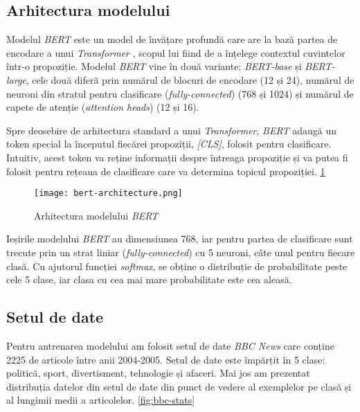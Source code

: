 \subsection{Arhitectura modelului}
Modelul \textit{BERT} este un model de învățare profundă care are la bază partea de encodare a unui \textit{Transformer} \cite{vaswani2023attention},
scopul lui fiind de a înțelege contextul cuvintelor într-o propoziție. Modelul \textit{BERT} vine în două
variante: \textit{BERT-base} și \textit{BERT-large}, cele două diferă prin numărul de blocuri de encodare (12 și 24),
numărul de neuroni din stratul pentru clasificare (\textit{fully-connected}) (768 și 1024) și numărul de
capete de atenție (\textit{attention heads}) (12 și 16).

\par
Spre deosebire de arhitectura standard a unui \textit{Transformer}, \textit{BERT} adaugă un token
special la începutul fiecărei propoziții, \textit{[CLS]}, folosit pentru clasificare. Intuitiv,
acest token va reține informații despre întreaga propoziție și va putea fi folosit pentru rețeaua
de clasificare care va determina topicul propoziției. \ref{fig:bert-architecture}

\begin{figure}[h]
    \centering
    \texttt{[image: bert-architecture.png]}
    \caption{Arhitectura modelului \textit{BERT} \protect\footnotemark[2]}
    \label{fig:bert-architecture}
\end{figure}
\vspace{1em}

\par
Ieșirile modelului \textit{BERT} au dimensiunea 768, iar pentru partea de clasificare sunt trecute
prin un strat liniar (\textit{fully-connected}) cu 5 neuroni, câte unul pentru fiecare clasă.
Cu ajutorul funcției \textit{softmax}, se obține o distribuție de probabilitate peste cele
5 clase, iar clasa cu cea mai mare probabilitate este cea aleasă.


\vspace{1em}

\subsection{Setul de date}
\vspace{1em}
Pentru antrenarea modelului am folosit setul de date \textit{BBC News} care conține 2225 de articole 
între anii 2004-2005. Setul de date este împărțit în 5 clase: politică, sport, divertisment, tehnologie
și afaceri. Mai jos am prezentat distribuția datelor din setul de date din punct de vedere al exemplelor
pe clasă și al lungimii medii a articolelor. \ref{fig:bbc-stats}

